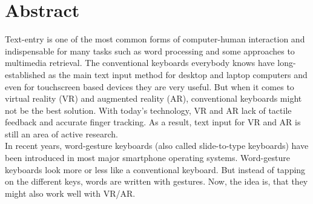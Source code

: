\chapter{Abstract}
Text-entry is one of the most common forms of computer-human interaction and indispensable for many tasks such as word processing and some approaches to multimedia retrieval. The conventional keyboards everybody knows have long-established as the main text input method for desktop and laptop computers and even for touchscreen based devices they are very useful. But when it comes to virtual reality (VR) and augmented reality (AR), conventional keyboards might not be the best solution. With today's technology, VR and AR lack of tactile feedback and accurate finger tracking. As a result, text input for VR and AR is still an area of active research.\\
In recent years, word-gesture keyboards (also called slide-to-type keyboards) have been introduced in most major smartphone operating systems. Word-gesture keyboards look more or less like a conventional keyboard. But instead of tapping on the different keys, words are written with gestures. Now, the idea is, that they might also work well with VR/AR.